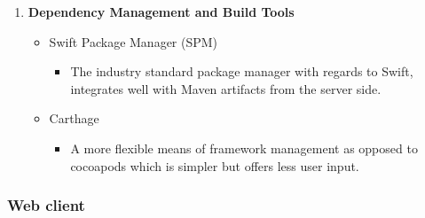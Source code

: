 \documentclass{article}
\begin{document}
\begin{enumerate}
			\item \textbf{Dependency Management and Build Tools}
				\begin{itemize}
					\item Swift Package Manager (SPM)
					\begin{itemize}
						\item The industry standard package manager with regards to Swift, integrates well with Maven artifacts from the server side.
					\end{itemize}
				\item Carthage
				\begin{itemize}
					\item A more flexible means of framework management as opposed to cocoapods which is simpler but offers less user input.
				\end{itemize}
				\end{itemize}
			\end{enumerate}
		
		\pagebreak
				
		\subsubsection{Web client}
		
\end{document}
